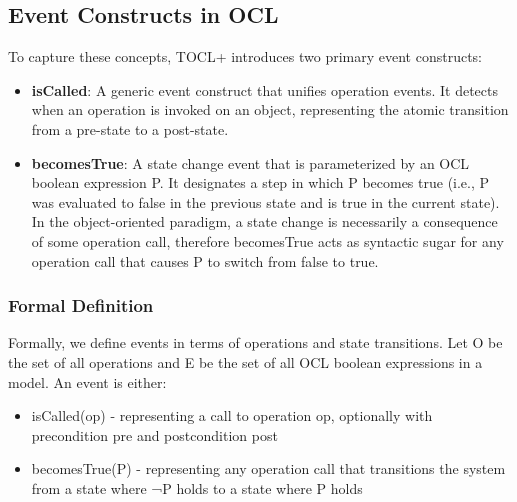\subsection{Event Constructs in OCL}

\hspace{1cm} 

To capture these concepts, TOCL+ introduces two primary event constructs:

\begin{itemize}
    \item \textbf{isCalled}: A generic event construct that unifies operation events. It detects when an operation is invoked on an object, representing the atomic transition from a pre-state to a post-state.
    
    \item \textbf{becomesTrue}: A state change event that is parameterized by an OCL boolean expression P. It designates a step in which P becomes true (i.e., P was evaluated to false in the previous state and is true in the current state). In the object-oriented paradigm, a state change is necessarily a consequence of some operation call, therefore becomesTrue acts as syntactic sugar for any operation call that causes P to switch from false to true.
\end{itemize}

\subsubsection{Formal Definition}

Formally, we define events in terms of operations and state transitions. Let O be the set of all operations and E be the set of all OCL boolean expressions in a model. An event is either:

\begin{itemize}
    \item isCalled(op) - representing a call to operation op, optionally with precondition pre and postcondition post
    \item becomesTrue(P) - representing any operation call that transitions the system from a state where ¬P holds to a state where P holds
\end{itemize}

